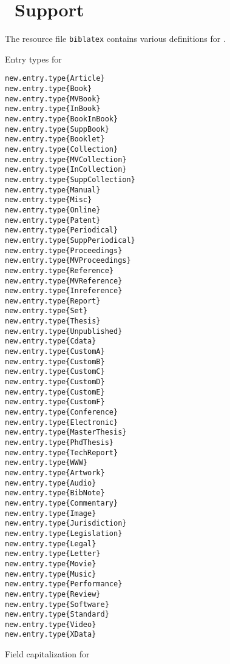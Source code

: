 \documentclass[11pt,a4paper]{scrbook}
\begin{document}
\section{\bibLaTeX\ Support}\label{lib:biblatex}

The resource file \verb|biblatex| contains various definitions for \bibLaTeX.

Entry types for \bibLaTeX{}

\begin{lstlisting}[language=BibTool]
new.entry.type{Article}
new.entry.type{Book}
new.entry.type{MVBook}
new.entry.type{InBook}
new.entry.type{BookInBook}
new.entry.type{SuppBook}
new.entry.type{Booklet}
new.entry.type{Collection}
new.entry.type{MVCollection}
new.entry.type{InCollection}
new.entry.type{SuppCollection}
new.entry.type{Manual}
new.entry.type{Misc}
new.entry.type{Online}
new.entry.type{Patent}
new.entry.type{Periodical}
new.entry.type{SuppPeriodical}
new.entry.type{Proceedings}
new.entry.type{MVProceedings}
new.entry.type{Reference}
new.entry.type{MVReference}
new.entry.type{Inreference}
new.entry.type{Report}
new.entry.type{Set}
new.entry.type{Thesis}
new.entry.type{Unpublished}
new.entry.type{Cdata}
new.entry.type{CustomA}
new.entry.type{CustomB}
new.entry.type{CustomC}
new.entry.type{CustomD}
new.entry.type{CustomE}
new.entry.type{CustomF}
new.entry.type{Conference}
new.entry.type{Electronic}
new.entry.type{MasterThesis}
new.entry.type{PhdThesis}
new.entry.type{TechReport}
new.entry.type{WWW}
new.entry.type{Artwork}
new.entry.type{Audio}
new.entry.type{BibNote}
new.entry.type{Commentary}
new.entry.type{Image}
new.entry.type{Jurisdiction}
new.entry.type{Legislation}
new.entry.type{Legal}
new.entry.type{Letter}
new.entry.type{Movie}
new.entry.type{Music}
new.entry.type{Performance}
new.entry.type{Review}
new.entry.type{Software}
new.entry.type{Standard}
new.entry.type{Video}
new.entry.type{XData}
\end{lstlisting}

Field capitalization for \bibLaTeX{}
\end{document}

